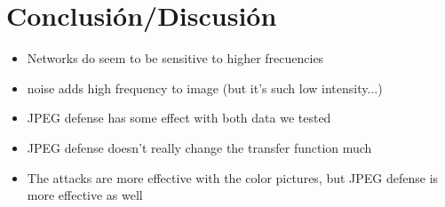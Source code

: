 \section{Conclusión/Discusión}
\begin{itemize}
    \item Networks do seem to be sensitive to higher frecuencies
    \item noise adds high frequency to image (but it's such low intensity...)
    \item JPEG defense has some effect with both data we tested
    \item JPEG defense doesn't really change the transfer function much
    \item The attacks are more effective with the color pictures, but JPEG defense is more effective as well
\end{itemize}